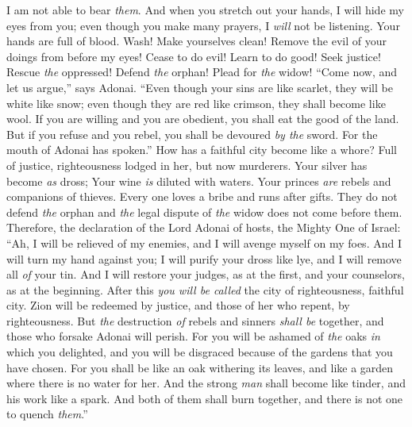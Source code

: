 \begin{biblechapter}
I am not able to bear \textit{them}.
\verse And when you stretch out your hands, 
I will hide my eyes from you; 
even though you make many prayers, 
I \textit{will} not be listening. 
Your hands are full of blood.
\verse Wash! Make yourselves clean! 
Remove the evil of your doings from before my eyes! 
Cease to do evil!
\verse Learn to do good! 
Seek justice! Rescue \textit{the} oppressed! 
Defend \textit{the} orphan! Plead for \textit{the} widow!
\verse “Come now, and let us argue,” says Adonai. 
“Even though your sins are like scarlet, they will be white like snow; 
even though they are red like crimson, they shall become like wool.
\verse If you are willing and you are obedient, 
you shall eat the good of the land.
\verse But if you refuse and you rebel, you shall be devoured \textit{by the} sword. For the mouth of Adonai has spoken.”
 How has a faithful city become like a whore? 
Full of justice, righteousness lodged in her, but now murderers.
\verse Your silver has become \textit{as} dross; 
Your wine \textit{is} diluted with waters.
\verse Your princes \textit{are} rebels 
and companions of thieves. 
Every one loves a bribe 
and runs after gifts. 
They do not defend \textit{the} orphan 
and \textit{the} legal dispute of \textit{the} widow does not come before them.
\verse Therefore, the declaration of the Lord Adonai of hosts, the Mighty One of Israel: 
“Ah, I will be relieved of my enemies, 
and I will avenge myself on my foes.
\verse And I will turn my hand against you; 
I will purify your dross like lye, 
and I will remove all \textit{of} your tin.
\verse And I will restore your judges, as at the first, 
and your counselors, as at the beginning. 
After this \textit{you will be called} the city of righteousness, 
faithful city.
\verse Zion will be redeemed by justice, 
and those of her who repent, by righteousness.
\verse But \textit{the} destruction \textit{of} rebels and sinners \textit{shall be} together, 
and those who forsake Adonai will perish.
\verse For you will be ashamed of \textit{the} oaks \textit{in} which you delighted, 
and you will be disgraced because of the gardens that you have chosen.
\verse For you shall be like an oak withering its leaves, 
and like a garden where there is no water for her.
\verse And the strong \textit{man} shall become like tinder, 
and his work like a spark. 
And both of them shall burn together, 
and there is not one to quench \textit{them}.”
\end{biblechapter}

